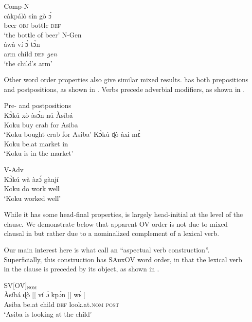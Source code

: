 \documentclass[output=paper,newtxmath,modfonts,nonflat,draftmode]{langsci/langscibook}
\begin{document}
\ea
\ea  \label{ex:Fongbe-CompN} {Comp-N}\\
\gll càkpálò sín gò {\'ɔ} \\
beer \textsc{obj} bottle \textsc{def} \\
\glt `the bottle of beer' \hfill \citep[][45]{lefebvre2002}
\ex \label{ex:Fongbe-NGen} {N-Gen}\\
\gll àwà ví {\'ɔ} {t{\`ɔ}n} \\
arm child \textsc{def} \textit{gen} \\
\glt `the child's arm' \hfill \citep[][45]{lefebvre2002}
\z
\z 

Other word order properties also give similar mixed results.  has both prepositions and postpositions, as shown in . Verbs precede adverbial modifiers, as shown in . 

\ea
\ea \label{ex:Fongbe-PP} {Pre- and postpositions}\\
 \gll K{\`ɔ}kú xò às{\'ɔ}n nú  Àsíbá \\
Koku buy crab for Asiba \\
\glt `Koku bought crab for Asiba' \hfill \citep[][302]{lefebvre2002}
\ex \gll K{\`ɔ}kú ɖò àxì m{\`ɛ}\\
Koku be.at market in \\
\glt `Koku is in the market' \hfill \citep[][325]{lefebvre2002}
\z
\z

\ea \label{ex:Fongbe-Adv}
{V-Adv}\\
\gll K{{\`ɔ}kú} wà {àz{\'ɔ}} gànjí \\
Koku do work well \\
\glt `Koku worked well' \hfill \citep[][381]{lefebvre2002}
\z

While it has some head-final properties,  is largely head-initial at the level of the clause. We demonstrate below that apparent OV order is not due to mixed clausal  in  but rather due to a nominalized complement of a lexical verb.

Our main interest here is what \citet{lefebvre2002} call an ``aspectual verb construction''. Superficially, this construction has SAuxOV word order, in that the lexical verb in the clause is preceded by its object, as shown in . 

\ea \label{ex:Fongbe-SVOV} {SV[OV]$_{\textsc{nom}}$}\\
\ea \gll Àsíbá  {ɖò} [[ ví {\'ɔ}  {kp{\'ɔ}n} ]] {w{\`ɛ}} ]  \\
Asiba be.at {} child \textsc{def} look.at.\textsc{nom} {} \textsc{post}  \\
\glt `Asiba is looking at the child' \hfill \citep[][215]{lefebvre2002}
\end{document}
